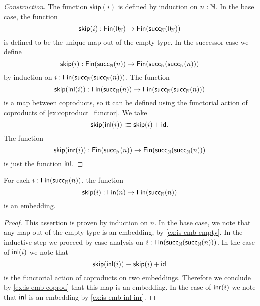 \begin{proof}[Construction]
  The function $\mathsf{skip}(i)$ is defined by induction on $n:{\mathbb{N}}$. In the base case, the function
  \begin{equation*}
    \mathsf{skip}(i):\mathsf{Fin}(0_{{\mathbb{N}}})\to\mathsf{Fin}(\mathsf{succ}_{{\mathbb{N}}}(0_{{\mathbb{N}}}))
  \end{equation*}
  is defined to be the unique map out of the empty type. In the successor case we define
  \begin{equation*}
    \mathsf{skip}(i) : \mathsf{Fin}(\mathsf{succ}_{{\mathbb{N}}}(n))\to\mathsf{Fin}(\mathsf{succ}_{{\mathbb{N}}}(\mathsf{succ}_{{\mathbb{N}}}(n))) 
  \end{equation*}
  by induction on $i:\mathsf{Fin}(\mathsf{succ}_{{\mathbb{N}}}(\mathsf{succ}_{{\mathbb{N}}}(n)))$. The function
  \begin{equation*}
    \mathsf{skip}({\mathsf{inl}}(i)):\mathsf{Fin}(\mathsf{succ}_{{\mathbb{N}}}(n))\to\mathsf{Fin}(\mathsf{succ}_{{\mathbb{N}}}(\mathsf{succ}_{{\mathbb{N}}}(n)))
  \end{equation*}
  is a map between coproducts, so it can be defined using the functorial action of coproducts of \cref{ex:coproduct_functor}. We take
  \begin{equation*}
    \mathsf{skip}({\mathsf{inl}}(i))\vcentcolon\equiv \mathsf{skip}(i)+\mathsf{id}_{}.
  \end{equation*}
  The function 
  \begin{equation*}
    \mathsf{skip}({\mathsf{inr}}(i)):\mathsf{Fin}(\mathsf{succ}_{{\mathbb{N}}}(n))\to\mathsf{Fin}(\mathsf{succ}_{{\mathbb{N}}}(\mathsf{succ}_{{\mathbb{N}}}(n)))
  \end{equation*}
  is just the function ${\mathsf{inl}}$.
\end{proof}

\begin{lem}
  For each $i:\mathsf{Fin}(\mathsf{succ}_{{\mathbb{N}}}(n))$, the function
  \begin{equation*}
    \mathsf{skip}(i):\mathsf{Fin}(n)\to\mathsf{Fin}(\mathsf{succ}_{{\mathbb{N}}}(n))
  \end{equation*}
  is an embedding.
\end{lem}

\begin{proof}
  This assertion is proven by induction on $n$. In the base case, we note that any map out of the empty type is an embedding, by \cref{ex:is-emb-empty}. In the inductive step we proceed by case analysis on $i:\mathsf{Fin}(\mathsf{succ}_{{\mathbb{N}}}(\mathsf{succ}_{{\mathbb{N}}}(n)))$. In the case of ${\mathsf{inl}}(i)$ we note that
  \begin{equation*}
    \mathsf{skip}({\mathsf{inl}}(i))\equiv \mathsf{skip}(i)+\mathsf{id}_{}
  \end{equation*}
  is the functorial action of coproducts on two embeddings. Therefore we conclude by \cref{ex:is-emb-coprod} that this map is an embedding. In the case of ${\mathsf{inr}}(i)$ we note that ${\mathsf{inl}}$ is an embedding by \cref{ex:is-emb-inl-inr}.
\end{proof}


